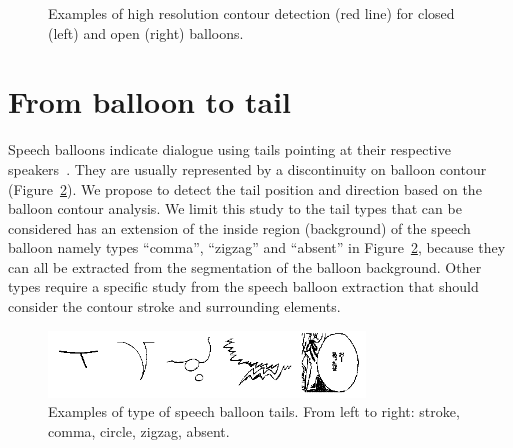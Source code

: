 
	\begin{figure}[!ht]	%
	  \centering
		\caption[Examples of high resolution contour detection for balloon extraction]{Examples of high resolution contour detection (red line) for closed (left) and open (right) balloons.}
		\label{fig:se:hd_contour}
	\end{figure}



\section{From balloon to tail} %
\label{sec:se:from_balloon_to_tail}

Speech balloons indicate dialogue using tails pointing at their respective speakers~\cite{Varnum2007Language}.
They are usually represented by a discontinuity on balloon contour (Figure~\ref{fig:se:tail_types}). 
We propose to detect the tail position and direction based on the balloon contour analysis.
We limit this study to the tail types that can be considered has an extension of the inside region (background) of the speech balloon namely types ``comma'', ``zigzag'' and ``absent'' in Figure~\ref{fig:se:tail_types}, because they can all be extracted from the segmentation of the balloon background.
Other types require a specific study from the speech balloon extraction that should consider the contour stroke and surrounding elements.

    \begin{figure}[ht]%
      \centering
      \includegraphics[trim= 0px 0px 0mm 0mm, clip, width=0.75\textwidth]{tail_types.png}
    \caption[Examples of type of speech balloon tails]{Examples of type of speech balloon tails. From left to right: stroke, comma, circle, zigzag, absent.}
    \label{fig:se:tail_types}
    \end{figure}

